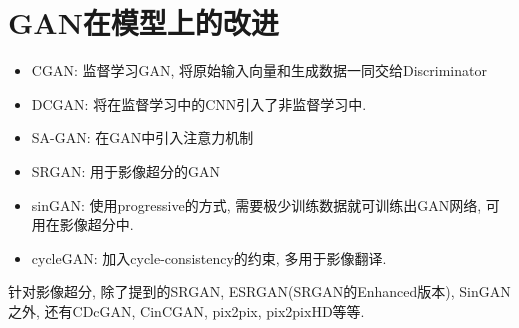 \section{GAN在模型上的改进}
\begin{itemize}
    \item CGAN: 监督学习GAN, 将原始输入向量和生成数据一同交给Discriminator
    \item DCGAN: 将在监督学习中的CNN引入了非监督学习中. 
    \item SA-GAN: 在GAN中引入注意力机制
    \item SRGAN: 用于影像超分的GAN
    \item sinGAN: 使用progressive的方式, 需要极少训练数据就可训练出GAN网络, 可用在影像超分中.
    \item cycleGAN: 加入cycle-consistency的约束, 多用于影像翻译.
\end{itemize}

针对影像超分, 除了提到的SRGAN, ESRGAN(SRGAN的Enhanced版本), SinGAN之外, 还有CDcGAN, CinCGAN, pix2pix, pix2pixHD等等.



